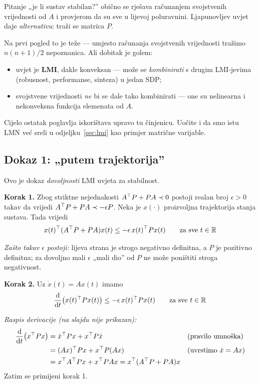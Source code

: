 \begin{napomena}
Pitanje „je li sustav stabilan?” obično se rješava računanjem svojstvenih
vrijednosti od $A$ i provjerom da su sve u lijevoj poluravnini. Ljapunovljev
uvjet daje \emph{alternativu}: traži se matrica $P$.

Na prvi pogled to je teže --- umjesto računanja svojstvenih vrijednosti tražimo
$n(n+1)/2$ nepoznanica. Ali dobitak je golem:
\begin{itemize}
  \item uvjet je \textbf{LMI}, dakle konveksan --- može se \emph{kombinirati} s
        drugim LMI-jevima (robusnost, performanse, sinteza) u jedan SDP;
  \item svojstvene vrijednosti \emph{ne} bi se dale tako kombinirati --- one su
        nelinearna i nekonveksna funkcija elemenata od $A$.
\end{itemize}
Cijelo ostatak poglavlja iskorištava upravo tu činjenicu. Uočite i da smo istu
LMN već sreli u odjeljku~\ref{sec:lmi}  kao primjer matrične
varijable.
\end{napomena}

\subsection{Dokaz 1: „putem trajektorija”}

Ovo je dokaz \emph{dovoljnosti} LMI uvjeta za stabilnost.

\textbf{Korak 1.} Zbog striktne nejednakosti $A^{\top} P + PA \prec 0$ postoji realan
broj $\epsilon > 0$ takav da vrijedi $A^{\top} P + PA \prec -\epsilon P$. Neka je
$x(\cdot)$ proizvoljna trajektorija stanja sustava. Tada vrijedi
\[
x(t)^{\top}(A^{\top} P + PA)x(t) \le -\epsilon\,x(t)^{\top} Px(t) \qquad\text{za sve } t \in \mathbb{R}
\]

\emph{Zašto takav $\epsilon$ postoji:} lijeva strana je strogo negativno
definitna, a $P$ je pozitivno definitna; za dovoljno mali $\epsilon$ „mali dio”
od $P$ ne može poništiti stroga negativnost.

\textbf{Korak 2.} Uz $\dot x(t) = Ax(t)$ imamo
\[
\frac{\mathrm{d}}{\mathrm{d} t}\big(x(t)^{\top} Px(t)\big) \le -\epsilon\,x(t)^{\top} Px(t)
\qquad\text{za sve } t \in \mathbb{R}
\]

\emph{Raspis derivacije (na slajdu nije prikazan):}
\begin{align}
\frac{\mathrm{d}}{\mathrm{d} t}\big(x^{\top} Px\big)
&= \dot x^{\top} Px + x^{\top} P\dot x
&& \text{(pravilo umnoška)} \\
&= (Ax)^{\top} Px + x^{\top} P(Ax)
&& \text{(uvrstimo } \dot x = Ax) \\
&= x^{\top} A^{\top} Px + x^{\top} PAx
= x^{\top}(A^{\top} P + PA)x
\end{align}
\checkmark \; Zatim se primijeni korak 1.

